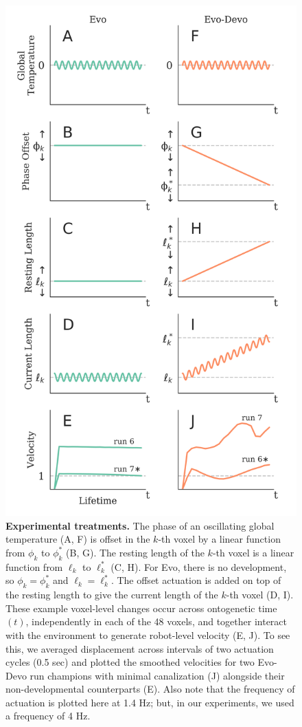 \begin{figure}
\centering
\includegraphics[width=0.6\linewidth]{Chapter04/FigS2}
\vspace{-4pt}
\caption{\label{fig:S2}\textbf{Experimental treatments.} The phase of an oscillating global temperature (A, F) is offset in the $k$-th voxel by a linear function from $\phi_k$ to $\phi_k^*$ (B, G). 
The resting length of the $k$-th voxel is a linear function from $\ell_k$ to $\ell_k^*$ (C, H). 
For Evo, there is no development, so $\phi_k=\phi_k^*$ and $\ell_k=\ell_k^*$.
The offset actuation is added on top of the resting length to give the current length of the $k$-th voxel (D, I). 
These example voxel-level changes occur across ontogenetic time $(t)$, independently in each of the 48 voxels, and together interact with the environment to generate robot-level velocity (E, J).
To see this, we averaged displacement across intervals of two actuation cycles (0.5 sec) and plotted the smoothed velocities for two Evo-Devo run champions with minimal canalization (J) alongside their non-developmental counterparts (E).
Also note that the frequency of actuation is plotted here at 1.4 Hz; but, in our experiments, we used a frequency of 4 Hz.
}
\end{figure}




